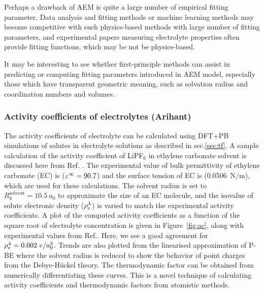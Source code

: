 \documentclass[../main.tex]{subfiles}
\begin{document}

Perhaps a drawback of AEM is quite a large number of empirical fitting parameter. Data analysis and fitting methods or machine learning methods may become competitive with such physics-based methods with large number of fitting parameters, and experimental papers measuring electrolyte properties often provide\cite{Hou2020,Wang2020} fitting functions, which may be not be physics-based.

It may be interesting to see whether first-principle methods can assist in predicting or computing fitting parameters introduced in AEM model, especially those which have transparent geometric meaning, such as solvation radius and coordination numbers and volumes.

\subsubsection{Activity coefficients of electrolytes (Arihant)}
The activity coefficients of electrolyte can be calculated using DFT+PB simulations of solutes in electrolyte solutions as described in sec.\ref{sec:tf}. A sample calculation of the activity coefficient of LiPF$_6$ in ethylene carbonate solvent is discussed here from Ref. . The experimental value of bulk permittivity of ethylene carbonate (EC) is ($\varepsilon^\infty=90.7$)\cite{Hall2015} and the surface tension of EC is (0.0506~N/m),\cite{Naejus2002} which are used for these calculations. %
The solvent radius is set to $R^\textrm{solvent}_k= 10.5~a_0$ to approximate the size of an EC molecule, and the isovalue of solute electronic density ($\rho_{\textrm{e}}^\lambda$) is varied to match the experimental activity coefficients. A plot of the computed activity coefficients as a function of the square root of electrolyte concentration is given in Figure~\ref{fig:ac}, along with experimental values from Ref.. Here, we see a good agreement for $\rho_{\textrm{e}}^\lambda=0.002~e/a_0^3$. Trends are also plotted from the linearised approximation of P-BE where the solvent radius is reduced to show the behavior of point charges from the Debye-H\"uckel theory.\cite{debye1923theory} The thermodynamic factor can be obtained from numerically differentiating these curves. %
This is a novel technique of calculating activity coefficients and thermodynamic factors from atomistic methods.
\end{document}

